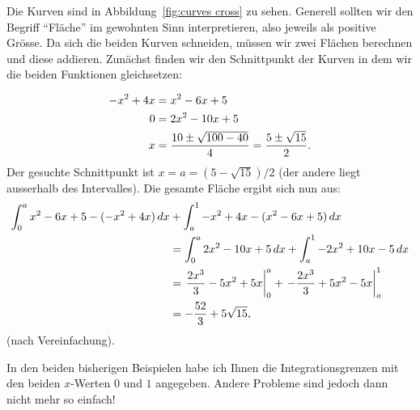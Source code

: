 \begin{solution}
Die Kurven sind in Abbildung~\ref{fig:curves cross} zu sehen. Generell sollten wir den Begriff ``Fläche'' im gewohnten Sinn interpretieren, also jeweils als positive Grösse. Da sich die beiden Kurven schneiden, müssen wir zwei Flächen berechnen und diese addieren. Zunächst finden wir den Schnittpunkt der Kurven in dem wir die beiden Funktionen gleichsetzen:

\begin{align*}
  -x^2+4x&=x^2-6x+5 \\
  0&=2x^2-10x+5 \\
  x&={10\pm\sqrt{100-40}\over4}={5\pm\sqrt{15}\over2}.
\end{align*}
Der gesuchte Schnittpunkt ist $x=a=(5-\sqrt{15})/2$ (der andere liegt ausserhalb des Intervalles). Die gesamte Fläche ergibt sich nun aus:
\begin{align*}
  \int_0^a x^2-6x+5-(-x^2+4x)\, d x&+\int_a^1 -x^2+4x-(x^2-6x+5)\, d x \\
  &=\int_0^a 2x^2-10x+5\, d x+\int_a^1 -2x^2+10x-5\, d x \\
  &=\left.{2x^3\over3}-5x^2+5x\right|_0^a + 
    \left.-{2x^3\over3}+5x^2-5x\right|_a^1 \\
  &=-{52\over3}+5\sqrt{15},
\end{align*}
(nach Vereinfachung).
\end{solution}

In den beiden bisherigen Beispielen habe ich Ihnen die Integrationsgrenzen mit den beiden $x$-Werten $0$ und $1$ angegeben. Andere Probleme sind jedoch dann nicht mehr so einfach!

